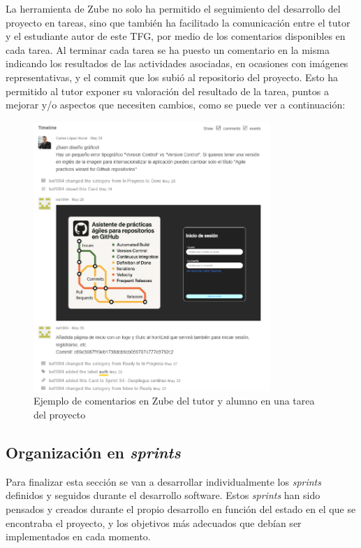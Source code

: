 La herramienta de Zube no solo ha permitido el seguimiento del desarrollo del proyecto en tareas, sino que también ha facilitado la comunicación entre el tutor y el estudiante autor de este TFG, por medio de los comentarios disponibles en cada tarea. Al terminar cada tarea se ha puesto un comentario en la misma indicando los resultados de las actividades asociadas, en ocasiones con imágenes representativas, y el commit que los subió al repositorio del proyecto. Esto ha permitido al tutor exponer su valoración del resultado de la tarea, puntos a mejorar y/o aspectos que necesiten cambios, como se puede ver a continuación:

\begin{figure}[H]
\centering
\includegraphics[width=0.8\textwidth]{img/ComentariosTareaZube.png}
\caption{Ejemplo de comentarios en Zube del tutor y alumno en una tarea del proyecto}
\label{fig:ComentariosTareaZube}
\end{figure}

\subsection{Organización en \textit{sprints}}

Para finalizar esta sección se van a desarrollar individualmente los \textit{sprints} definidos y seguidos durante el desarrollo software. Estos \textit{sprints} han sido pensados y creados durante el propio desarrollo en función del estado en el que se encontraba el proyecto, y los objetivos más adecuados que debían ser implementados en cada momento.

